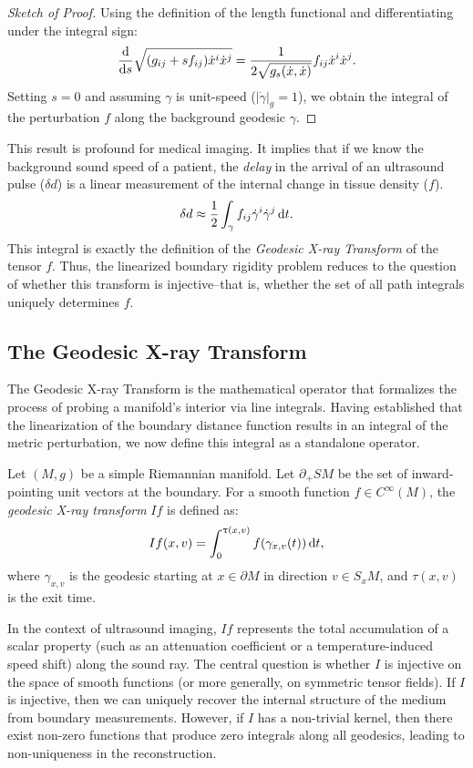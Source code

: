 \begin{proof}[Sketch of Proof]
  Using the definition of the length functional and differentiating under the integral sign:
  \[%
    \odv{}{s} \sqrt{(g_{ij} + s f_{ij})\dot{x}^i \dot{x}^j} = \frac{1}{2\sqrt{g_s(\dot{x}, \dot{x})}} f_{ij} \dot{x}^i \dot{x}^j
  .\]%
  Setting $s = 0$ and assuming $\gamma$ is unit-speed ($|\dot{\gamma}|_g = 1$), we obtain the integral of the perturbation $f$ along the background geodesic $\gamma$.
\end{proof}

This result is profound for medical imaging. It implies that if we know the background sound speed of a patient, the \emph{delay} in the arrival of an ultrasound pulse ($\delta d$) is a linear measurement of the internal change in tissue density ($f$).
\[%
  \delta d \approx \frac{1}{2} \int_{\gamma} f_{ij} \dot{\gamma}^i \dot{\gamma}^j \dt
.\]%
This integral is exactly the definition of the \emph{Geodesic X-ray Transform} of the tensor $f$. Thus, the linearized boundary rigidity problem reduces to the question of whether this transform is injective--that is, whether the set of all path integrals uniquely determines $f$.

\subsection{The Geodesic X-ray Transform} The Geodesic X-ray Transform is the mathematical operator that formalizes the process of probing a manifold's interior via line integrals. Having established that the linearization of the boundary distance function results in an integral of the metric perturbation, we now define this integral as a standalone operator.

\begin{definition}
  Let $(M, g)$ be a simple Riemannian manifold. Let $\partial_+ SM$ be the set of inward-pointing unit vectors at the boundary. For a smooth function $f \in C^\infty(M)$, the \emph{geodesic X-ray transform} $I f$ is defined as:
  \[%
    If(x, v) = \int_{0}^{\tau(x, v)} f(\gamma_{x,v}(t)) \dt
  ,\]%
  where $\gamma_{x,v}$ is the geodesic starting at $x \in \partial M$ in direction $v \in S_xM$, and $\tau(x, v)$ is the exit time.
\end{definition}

In the context of ultrasound imaging, $If$ represents the total accumulation of a scalar property (such as an attenuation coefficient or a temperature-induced speed shift) along the sound ray. The central question is whether $I$ is injective on the space of smooth functions (or more generally, on symmetric tensor fields). If $I$ is injective, then we can uniquely recover the internal structure of the medium from boundary measurements. However, if $I$ has a non-trivial kernel, then there exist non-zero functions that produce zero integrals along all geodesics, leading to non-uniqueness in the reconstruction.

